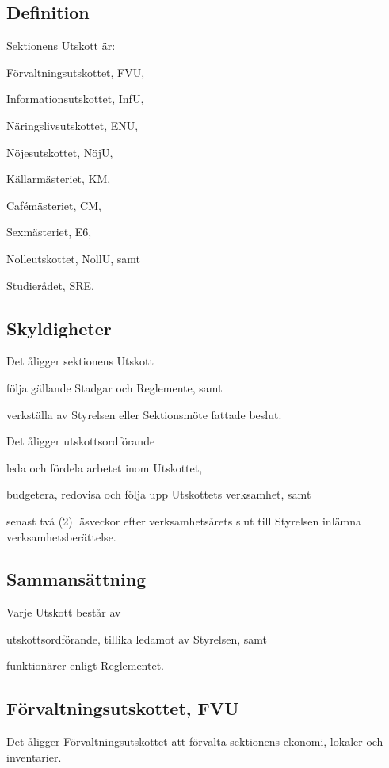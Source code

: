 \documentclass[10pt]{article}
\begin{document}
\subsection{Definition}
Sektionens Utskott är:
\begin{alphlist}
\item Förvaltningsutskottet, FVU,
\item Informationsutskottet, InfU,
\item Näringslivsutskottet, ENU,
\item Nöjesutskottet, NöjU,
\item Källarmästeriet, KM,
\item Cafémästeriet, CM,
\item Sexmästeriet, E6,
\item Nolleutskottet, NollU, samt
\item Studierådet, SRE.
\end{alphlist}

\subsection{Skyldigheter}
Det åligger sektionens Utskott
\begin{attlist}
\item följa gällande Stadgar och Reglemente, samt
\item verkställa av Styrelsen eller Sektionsmöte fattade beslut.
\end{attlist}
Det åligger utskottsordförande
\begin{attlist}
\item leda och fördela arbetet inom Utskottet,
\item budgetera, redovisa och följa upp Utskottets verksamhet, samt
\item senast två (2) läsveckor efter verksamhetsårets slut till Styrelsen
    inlämna verksamhetsberättelse.
\end{attlist}

\subsection{Sammansättning}
Varje Utskott består av
\begin{alphlist}
\item utskottsordförande, tillika ledamot av Styrelsen, samt
\item funktionärer enligt Reglementet.
\end{alphlist}

\subsection{Förvaltningsutskottet, FVU}
Det åligger Förvaltningsutskottet att förvalta sektionens ekonomi,
lokaler och inventarier.
\end{document}
